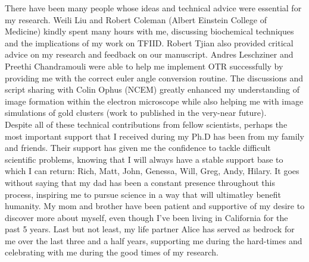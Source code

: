 \documentclass{ucbthesis}
\begin{document}
\begin{frontmatter}
\begin{acknowledgements}
\indent There have been many people whose ideas and technical advice were essential for my research. Weili Liu and Robert Coleman (Albert Einstein College of Medicine) kindly spent many hours with me, discussing biochemical techniques and the implications of my work on TFIID. Robert Tjian also provided critical advice on my research and feedback on our manuscript. Andres Leschziner and Preethi Chandramouli were able to help me implement OTR successfully by providing me with the correct euler angle conversion routine. The discussions and script sharing with Colin Ophus (NCEM) greatly enhanced my understanding of image formation within the electron microscope while also helping me with image simulations of gold clusters (work to published in the very-near future).  \\
\indent Despite all of these technical contributions from fellow scientists, perhaps the most important support that I received during my Ph.D has been from my family and friends. Their support has given me the confidence to tackle difficult scientific problems, knowing that I will always have a stable support base to which I can return: Rich, Matt, John, Genessa, Will, Greg, Andy, Hilary. It goes without saying that my dad has been a constant presence throughout this process, inspiring me to pursue science in a way that will ultimatley benefit humanity. My mom and brother have been patient and supportive of my desire to discover more about myself, even though I've been living in California for the past 5 years.  Last but not least, my life partner Alice has served as bedrock for me over the last three and a half years, supporting me during the hard-times and celebrating with me during the good times of my research. \\ 
\end{acknowledgements}

\end{frontmatter}

\pagestyle{headings}







\appendix




\printbibliography
\end{document}
